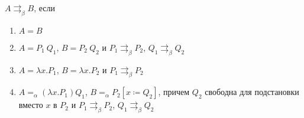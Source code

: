 \documentclass[aspectratio=169]{beamer}
\begin{document}
\newcommand{\bpar}{\rightrightarrows_{\beta}}

\begin{frame}{}
\begin{dfn}
	$A\bpar B$, если
	\begin{enumerate}
		\item $A=B$
		\item $A=P_{1}\ Q_{1}$, $B=P_{2}\ Q_{2}$ и $P_{1}\bpar P_{2}$, $Q_{1}\bpar Q_{2}$
		\item $A=\lambda{}x.P_{1}$, $B=\lambda{}x.P_{2}$ и 
		$P_{1}\bpar P_{2}$
		\item $A=_{\alpha}(\lambda{}x.P_1)Q_1$, $B=_{\alpha}P_2[x\coloneqq{}Q_2]$, причем $Q_2$ свободна для подстановки вместо $x$ в $P_2$ и $P_1 \bpar P_2$, $Q_1 \bpar Q_2$
	\end{enumerate}
\end{dfn}
\end{frame}
\end{document}

